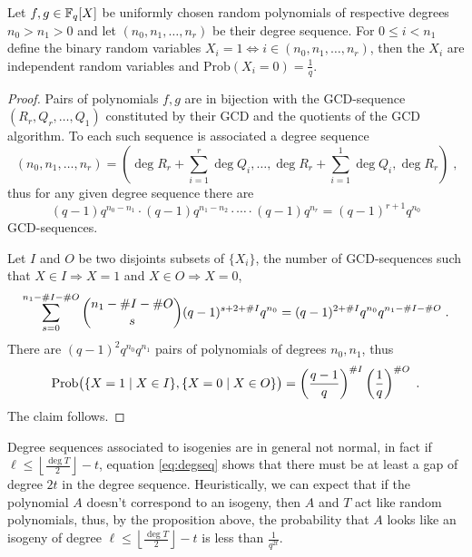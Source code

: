 \begin{proposition}
  \label{th:normseq}
  Let $f,g\in\mathbb{F}_q[X]$ be uniformly chosen random polynomials of
  respective degrees $n_0>n_1>0$ and let $(n_0, n_1, \ldots, n_r)$ be
  their degree sequence. For $0\le i < n_1$ define the binary random
  variables $X_i = 1 \Leftrightarrow i\in(n_0,n_1,\ldots,n_r)$, then
  the $X_i$ are independent random variables and $\mathrm{Prob}(X_i=0) =
  \frac{1}{q}$.
\end{proposition}
\begin{proof}
  Pairs of polynomials $f,g$ are in bijection with the GCD-sequence
  $(R_r, Q_r, \ldots, Q_1)$ constituted by their GCD and the quotients
  of the GCD algorithm. To each such sequence is associated a degree
  sequence
  \begin{equation*}
    (n_0,n_1,\ldots,n_r) =
    \left(\deg R_r + \sum_{i=1}^r\deg Q_i, \ldots, \deg R_r + \sum_{i=1}^1\deg Q_i, \deg R_r\right)
    \;\text{,} 
  \end{equation*}
  thus for any given degree sequence there are
  \begin{equation*}
    (q-1)q^{n_0-n_1}\cdot(q-1)q^{n_1-n_2}\cdot\cdots\cdot(q-1)q^{n_r} =
    (q-1)^{r+1}q^{n_0}
  \end{equation*}
  GCD-sequences.
 
  Let $I$ and $O$ be two disjoints subsets of $\{X_i\}$, the number of
  GCD-sequences such that $X\in I \Rightarrow X=1$ and $X\in O
  \Rightarrow X=0$,
  \begin{equation*}
     \sum_{s=0}^{n_1-\# I-\# O}\binom{n_1-\# I-\# O}{s}(q-1)^{s+2+\# I}q^{n_0} =
    (q-1)^{2+\# I}q^{n_0}q^{n_1-\# I-\# O}
    \;\text{.}
  \end{equation*}
  There are $(q-1)^2q^{n_0}q^{n_1}$ pairs of polynomials of degrees
  $n_0,n_1$, thus
  \begin{equation}
   \label{th:normseq:prob}
    \mathrm{Prob}\bigl(\{X = 1 \mid X\in I\},
    \{X=0\mid X\in O\}\bigr) = \left(\frac{q-1}{q}\right)^{\# I}\left(\frac{1}{q}\right)^{\# O}
    \;\text{.}
  \end{equation}
  The claim follows.
\end{proof}

Degree sequences associated to isogenies are in general not normal, in
fact if $\ell\le\left\lfloor\frac{\deg T}{2}\right\rfloor-t$, equation
\eqref{eq:degseq} shows that there must be at least a gap of degree
$2t$ in the degree sequence. Heuristically, we can expect that if the
polynomial $A$ doesn't correspond to an isogeny, then $A$ and $T$ act
like random polynomials, thus, by the proposition above, the
probability that $A$ looks like an isogeny of degree
$\ell\le\left\lfloor\frac{\deg T}{2}\right\rfloor-t$ is less than $\frac{1}{q^{2t}}$.

